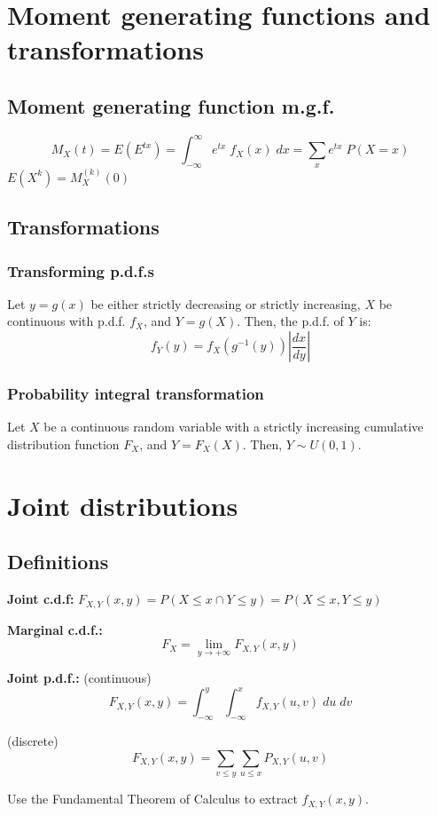 \documentclass[15pt]{article}
\begin{document}
\section{Moment generating functions and transformations}
\subsection{Moment generating function m.g.f.}
\[
    M_X (t) = E(E^{tx}) = \int_{-\infty}^{\infty}  e^{tx} \; f_X (x) \; dx = \sum_x e^{tx} \; P(X = x)
\]
$E(X^k) = M_X^{(k)} (0)$

\subsection{Transformations}
\subsubsection{Transforming p.d.f.s}
Let $y = g(x)$ be either strictly decreasing or strictly increasing, $X$ be continuous with p.d.f. $f_X$, and $Y = g(X)$. Then, the p.d.f. of $Y$ is:
\[
    f_Y (y) = f_X (g^{-1} (y)) \left|\frac{dx}{dy}\right|
\]

\subsubsection{Probability integral transformation}
Let $X$ be a continuous random variable with a strictly increasing cumulative distribution function $F_X$, and $Y = F_X (X)$. Then, $Y \sim U(0,1)$.

\section{Joint distributions}
\subsection{Definitions}
\textbf{Joint c.d.f:} $F_{X,Y} (x,y) = P(X \leq x \cap Y \leq y) = P(X \leq x, Y \leq y)$

\textbf{Marginal c.d.f.:} 
\[
	F_X = \lim_{y \to + \infty} F_{X,Y} (x,y)
\]

\textbf{Joint p.d.f.:} (continuous)
\[
    F_{X,Y} (x,y) = \int_{-\infty}^y \int_{-\infty}^x f_{X,Y} (u,v) \; du \; dv
\]

(discrete)
\[
    F_{X,Y} (x,y) = \sum_{v \leq y} \sum_{u \leq x} P_{X,Y} (u,v)
\]

Use the Fundamental Theorem of Calculus to extract $f_{X,Y} (x,y)$.
\end{document}
